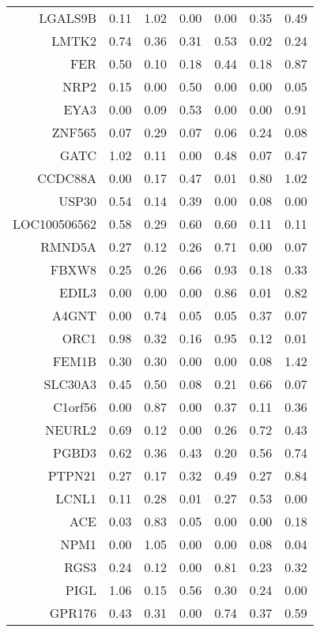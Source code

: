 \begin{longtable}{rrrrrrr}
  LGALS9B & 0.11 & 1.02 & 0.00 & 0.00 & 0.35 & 0.49 \\ 
  LMTK2 & 0.74 & 0.36 & 0.31 & 0.53 & 0.02 & 0.24 \\ 
  FER & 0.50 & 0.10 & 0.18 & 0.44 & 0.18 & 0.87 \\ 
  NRP2 & 0.15 & 0.00 & 0.50 & 0.00 & 0.00 & 0.05 \\ 
  EYA3 & 0.00 & 0.09 & 0.53 & 0.00 & 0.00 & 0.91 \\ 
  ZNF565 & 0.07 & 0.29 & 0.07 & 0.06 & 0.24 & 0.08 \\ 
  GATC & 1.02 & 0.11 & 0.00 & 0.48 & 0.07 & 0.47 \\ 
  CCDC88A & 0.00 & 0.17 & 0.47 & 0.01 & 0.80 & 1.02 \\ 
  USP30 & 0.54 & 0.14 & 0.39 & 0.00 & 0.08 & 0.00 \\ 
  LOC100506562 & 0.58 & 0.29 & 0.60 & 0.60 & 0.11 & 0.11 \\ 
  RMND5A & 0.27 & 0.12 & 0.26 & 0.71 & 0.00 & 0.07 \\ 
  FBXW8 & 0.25 & 0.26 & 0.66 & 0.93 & 0.18 & 0.33 \\ 
  EDIL3 & 0.00 & 0.00 & 0.00 & 0.86 & 0.01 & 0.82 \\ 
  A4GNT & 0.00 & 0.74 & 0.05 & 0.05 & 0.37 & 0.07 \\ 
  ORC1 & 0.98 & 0.32 & 0.16 & 0.95 & 0.12 & 0.01 \\ 
  FEM1B & 0.30 & 0.30 & 0.00 & 0.00 & 0.08 & 1.42 \\ 
  SLC30A3 & 0.45 & 0.50 & 0.08 & 0.21 & 0.66 & 0.07 \\ 
  C1orf56 & 0.00 & 0.87 & 0.00 & 0.37 & 0.11 & 0.36 \\ 
  NEURL2 & 0.69 & 0.12 & 0.00 & 0.26 & 0.72 & 0.43 \\ 
  PGBD3 & 0.62 & 0.36 & 0.43 & 0.20 & 0.56 & 0.74 \\ 
  PTPN21 & 0.27 & 0.17 & 0.32 & 0.49 & 0.27 & 0.84 \\ 
  LCNL1 & 0.11 & 0.28 & 0.01 & 0.27 & 0.53 & 0.00 \\ 
  ACE & 0.03 & 0.83 & 0.05 & 0.00 & 0.00 & 0.18 \\ 
  NPM1 & 0.00 & 1.05 & 0.00 & 0.00 & 0.08 & 0.04 \\ 
  RGS3 & 0.24 & 0.12 & 0.00 & 0.81 & 0.23 & 0.32 \\ 
  PIGL & 1.06 & 0.15 & 0.56 & 0.30 & 0.24 & 0.00 \\ 
  GPR176 & 0.43 & 0.31 & 0.00 & 0.74 & 0.37 & 0.59 \\ 
   \hline
\hline
\end{longtable}
